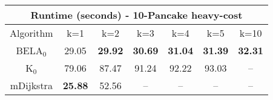\begin{tabular}{c|cccccc}\toprule
\multicolumn{7}{c}{Runtime (seconds) - 10-Pancake heavy-cost}\\ \midrule
Algorithm & k=1 & k=2 & k=3 & k=4 & k=5 & k=10 \\ \midrule
BELA$_0$ & 29.05 & \textbf{29.92} & \textbf{30.69} & \textbf{31.04} & \textbf{31.39} & \textbf{32.31} \\
K$_0$ & 79.06 & 87.47 & 91.24 & 92.22 & 93.03 & -- \\
mDijkstra & \textbf{25.88} & 52.56 & -- & -- & -- & -- \\ \bottomrule 
\end{tabular}
